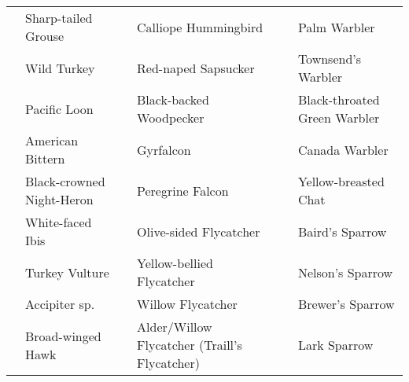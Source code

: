 \documentclass{article}
\begin{document}
\begin{center}
\begin{tabularx}{\textwidth}{cXcXcX}
\underline{\hspace{3ex}} 	 &Sharp-tailed Grouse 	 &\underline{\hspace{3ex}} 	 &Calliope Hummingbird 	 &\underline{\hspace{3ex}} 	 &Palm Warbler \\ 
\underline{\hspace{3ex}} 	 &Wild Turkey 	 &\underline{\hspace{3ex}} 	 &Red-naped Sapsucker 	 &\underline{\hspace{3ex}} 	 &Townsend's Warbler \\ 
\underline{\hspace{3ex}} 	 &Pacific Loon 	 &\underline{\hspace{3ex}} 	 &Black-backed Woodpecker 	 &\underline{\hspace{3ex}} 	 &Black-throated Green Warbler \\ 
\underline{\hspace{3ex}} 	 &American Bittern 	 &\underline{\hspace{3ex}} 	 &Gyrfalcon 	 &\underline{\hspace{3ex}} 	 &Canada Warbler \\ 
\underline{\hspace{3ex}} 	 &Black-crowned Night-Heron 	 &\underline{\hspace{3ex}} 	 &Peregrine Falcon 	 &\underline{\hspace{3ex}} 	 &Yellow-breasted Chat \\ 
\underline{\hspace{3ex}} 	 &White-faced Ibis 	 &\underline{\hspace{3ex}} 	 &Olive-sided Flycatcher 	 &\underline{\hspace{3ex}} 	 &Baird's Sparrow \\ 
\underline{\hspace{3ex}} 	 &Turkey Vulture 	 &\underline{\hspace{3ex}} 	 &Yellow-bellied Flycatcher 	 &\underline{\hspace{3ex}} 	 &Nelson's Sparrow \\ 
\underline{\hspace{3ex}} 	 &Accipiter sp. 	 &\underline{\hspace{3ex}} 	 &Willow Flycatcher 	 &\underline{\hspace{3ex}} 	 &Brewer's Sparrow \\ 
\underline{\hspace{3ex}} 	 &Broad-winged Hawk 	 &\underline{\hspace{3ex}} 	 &Alder/Willow Flycatcher (Traill's Flycatcher) 	 &\underline{\hspace{3ex}} 	 &Lark Sparrow \\ 

\end{tabularx}
\end{center}
\end{document}
